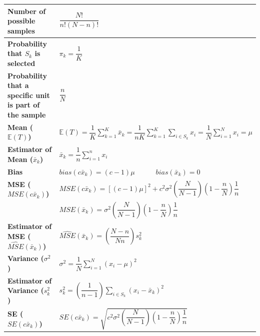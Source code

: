 \renewcommand{\arraystretch}{2.5}
\begin{longtable}{|p{5cm}|p{9cm}|}
    \hline\endfirsthead
    \hline\endhead
    \hline\endfoot
    \hline\endlastfoot

    \textbf{Number of possible samples} & \( \dfrac{N!}{n!(N-n)!} \) \\
    \hline

    \textbf{Probability that $S_k$ is selected} & $\pi_k = \dfrac{1}{K}$ \\
    \hline

    \textbf{Probability that a specific unit is part of the sample} & $\dfrac{n}{N}$ \\
    \hline

    \textbf{Mean ($\mathbb{E}(T)$)} & $
        \mathbb{E}(T) = 
        \dfrac{1}{K} \displaystyle\sum_{k=1}^{K}
        \bar{x}_k 
        =
        \dfrac{1}{nK} \displaystyle\sum_{k=1}^{K}
        \displaystyle\sum_{i \in S_k} x_i
        =
        \dfrac{1}{N} \displaystyle\sum_{i=1}^{N} x_i
        = \mu
    $ \\[2ex]
    \hline

    \textbf{Estimator of Mean ($\bar{x}_k$)} & $
        \bar{x}_k=
        \dfrac{1}{n} \displaystyle\sum_{i=1}^{n} x_i
    $ \\[2ex]
    \hline

    \textbf{Bias} & $
        bias(c\bar{x}_k) = (c-1)\mu
        \quad\quad\quad
        bias(\bar{x}_k) = 0
    $ \\[1ex]
    \hline

    \textbf{MSE ($MSE(c\bar{x}_k)$)} & $
        MSE(c\bar{x}_k) 
        = [(c-1)\mu]^2 +
        c^2 \sigma^2 \left(\dfrac{N}{N-1} \right)\left( 1-\dfrac{n}{N} \right)\dfrac{1}{n}
    $\\[1ex]
    & $MSE(\bar{x}_k) 
        = \sigma^2 \left(\dfrac{N}{N-1} \right)\left( 1-\dfrac{n}{N} \right)\dfrac{1}{n}$ \\[1ex]
    \hline

    \textbf{Estimator of MSE ($\hat{MSE}(\bar{x}_k)$)} & $
        \hat{MSE}(\bar{x}_k) = \left(\dfrac{N-n}{Nn} \right)s_k^2
    $\\[1ex]
    \hline

    \textbf{Variance ($\sigma^2$)} & $
        \sigma^2 = \dfrac{1}{N} \displaystyle\sum_{i=1}^{N}
        (x_i - \mu)^2
    $\\[1ex]
    \hline

    \textbf{Estimator of Variance ($s_k^2$)} & $
        s_k^2 = \left(\dfrac{1}{n-1}\right) \displaystyle\sum_{i\in S_k}
        (x_i - \bar{x}_k)^2
    $\\[1ex]
    \hline

    \textbf{SE ($SE(c\bar{x}_k)$)} & $
        SE(c\bar{x}_k) = \sqrt{
            c^2 \sigma^2 \left(\dfrac{N}{N-1} \right)\left( 1-\dfrac{n}{N} \right)\dfrac{1}{n}
        }
    $\\[1ex]
    \hline
\end{longtable}


